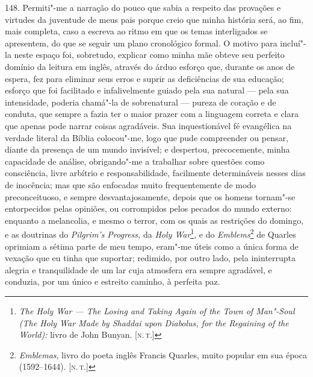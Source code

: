 148. Permiti"-me a narração do pouco que sabia a respeito das provações e
virtudes da juventude de meus pais porque creio que minha história será,
ao fim, mais completa, caso a escreva ao ritmo em que os temas
interligados se apresentem, do que se seguir um plano cronológico
formal. O motivo para incluí"-la neste espaço foi, sobretudo, explicar
como minha mãe obteve seu perfeito domínio da leitura em inglês, através
do árduo esforço que, durante os anos de espera, fez para eliminar seus
erros e suprir as deficiências de sua educação; esforço que foi
facilitado e infalivelmente guiado pela sua natural --- pela sua
intensidade, poderia chamá"-la de sobrenatural --- pureza de coração e de
conduta, que sempre a fazia ter o maior prazer com a linguagem correta e
clara que apenas pode narrar coisas agradáveis. Sua inquestionável fé
evangélica na verdade literal da Bíblia colocou"-me, logo que pude
compreender ou pensar, diante da presença de um mundo invisível; e
despertou, precocemente, minha capacidade de análise, obrigando"-me a
trabalhar sobre questões como consciência, livre arbítrio e
responsabilidade, facilmente determináveis nesses dias de inocência; mas
que são enfocadas muito frequentemente de modo preconceituoso, e sempre
desvantajosamente, depois que os homens tornam"-se entorpecidos pelas
opiniões, ou corrompidos pelos pecados do mundo externo: enquanto a
melancolia, e mesmo o terror, com os quais as restrições do domingo, e
as doutrinas do \emph{Pilgrim's Progress,} da \emph{Holy War}\footnote{\emph{The
  Holy War --- The Losing and Taking Again of the Town of Man"-Soul (The
  Holy War Made by Shaddai upon Diabolus, for the Regaining of the
  World):} livro de John Bunyan. {[}\textsc{n.\,t.}{]}}, e do
\emph{Emblems}\footnote{\emph{Emblemas}, livro do poeta inglês Francis
  Quarles, muito popular em sua época (1592--1644). {[}\textsc{n.\,t.}{]}} de
Quarles oprimiam a sétima parte de meu tempo, eram"-me úteis como a única
forma de vexação que eu tinha que suportar; redimido, por outro lado,
pela ininterrupta alegria e tranquilidade de um lar cuja atmosfera era
sempre agradável, e conduzia, por um único e estreito caminho, à
perfeita paz.

